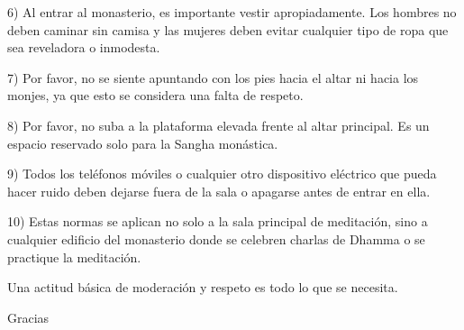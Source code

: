6) Al entrar al monasterio, es importante vestir apropiadamente. Los hombres no deben caminar sin camisa y las mujeres deben evitar cualquier tipo de ropa que sea reveladora o inmodesta.

7) Por favor, no se siente apuntando con los pies hacia el altar ni hacia los monjes, ya que esto se considera una falta de respeto.

8) Por favor, no suba a la plataforma elevada frente al altar principal. Es un espacio reservado solo para la Sangha monástica.

9) Todos los teléfonos móviles o cualquier otro dispositivo eléctrico que pueda hacer ruido deben dejarse fuera de la sala o apagarse antes de entrar en ella.

10) Estas normas se aplican no solo a la sala principal de meditación, sino a cualquier edificio del monasterio donde se celebren charlas de Dhamma o se practique la meditación.

Una actitud básica de moderación y respeto es todo lo que se necesita.

Gracias




